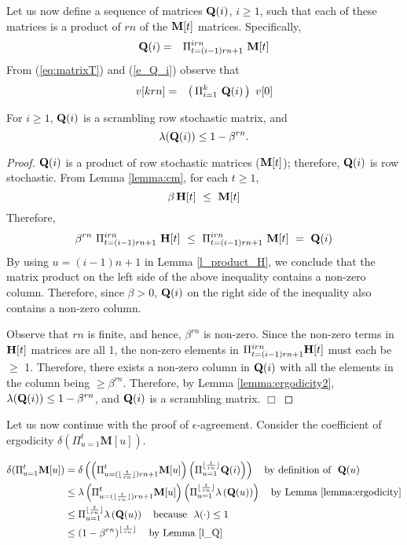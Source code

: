 \documentclass{llncs}
\newcommand{\fillbox}{\hspace*{\fill}\(\Box\)}
\newcommand{\bfH}{{\bf H}}
\newcommand{\bfQ}{{\bf Q}}
\newcommand{\bfM}{{\bf M}}
\newcommand{\bfv}{v}
\newcommand{\matrixm}{\textbf{M}}
\begin{document}
Let us now define a sequence of matrices $\bfQ(i)$, $i\geq 1$, such that
each of these matrices is a product of $r n$ of the
$\bfM[t]$ matrices. Specifically,
\begin{eqnarray}
\bfQ(i) &=& \Pi_{t=(i-1)r n+1}^{i r n} ~ \bfM[t]
\label{e_Q_i}
\end{eqnarray}
From (\ref{eq:matrixT}) and (\ref{e_Q_i})
observe that
\begin{eqnarray}
\bfv[k r n] & = & \left(\, \Pi_{i=1}^k ~ \bfQ(i) \,\right)~\bfv[0]
\end{eqnarray}


\begin{lemma}
\label{l_Q}
For $i\geq 1$, $\bfQ(i)$ is a scrambling row stochastic matrix,
and \[ \lambda(\bfQ(i))\leq 1-\beta^{r n}.\]
\end{lemma}

\begin{proof}

$\bfQ(i)$ is a product of row stochastic matrices ($\bfM[t]$); therefore,
$\bfQ(i)$ is row stochastic.
From Lemma \ref{lemma:cm}, for each $t\geq 1$,
\[
\beta \, \bfH[t] ~ \leq ~ \bfM[t]
\]
Therefore, 
\[
\beta^{r n} ~ \Pi_{t=(i-1)r n+1}^{i r n} ~ \bfH[t] ~ \leq 
~ \Pi_{t=(i-1) r n+1}^{i r n} ~ \bfM[t] ~ =
~ \bfQ(i)
\]
By using $u=(i-1)n+1$ in Lemma \ref{l_product_H},
we conclude that the matrix product on the left side
of the above inequality contains a non-zero column. Therefore, since $\beta > 0$, $\bfQ(i)$ on the
right side of the inequality also contains
a non-zero column.

Observe that $r n$ is finite, and hence, $\beta^{r n}$
is non-zero. Since the non-zero terms in $\bfH[t]$ matrices are all 1,
the non-zero elements in $\Pi_{t=(i-1) r n+1}^{i r n} \bfH[t]$
must each be $\geq$ 1. Therefore, there exists a non-zero column in $\bfQ(i)$
with all the elements in the column being $\geq \beta^{r n}$.
Therefore, by Lemma \ref{lemma:ergodicity2}, $\lambda(\bfQ(i))\leq 1-\beta^{r n}$, and $\bfQ(i)$ is a scrambling matrix. 
\fillbox
\end{proof}

Let us now continue with the proof of $\epsilon$-agreement. Consider the coefficient of ergodicity $\delta(\Pi_{u=1}^t \matrixm[u])$.




\begin{align}
\delta(\Pi_{u=1}^t \bfM[u]) &= \delta\left(
\left(\Pi_{u=(\lfloor\frac{t}{r n}\rfloor)r n+1}^t \bfM[u]\right)
\left(\Pi_{u=1}^{\lfloor\frac{t}{r n}\rfloor} \bfQ(i)\right)\right)~~~\text{by definition of}~~\bfQ(u)\nonumber\\
&\leq \lambda
\left(\Pi_{u=(\lfloor\frac{t}{r n}\rfloor)r n+1}^t \bfM[u]\right)
\left(\Pi_{u=1}^{\lfloor\frac{t}{r n}\rfloor} \lambda\left( \bfQ(u)\right)\right)~~~\text{by Lemma \ref{lemma:ergodicity}}\nonumber\\
&\leq \Pi_{u=1}^{\lfloor\frac{t}{r n}\rfloor} \lambda\left(\bfQ(u)\right)~~~\text{because}~~\lambda(\cdot) \leq 1\nonumber\\
&\leq \left( 1-\beta^{rn}\right)^{\lfloor\frac{t}{r n}\rfloor}~~~\text{by Lemma \ref{l_Q}}\label{eq:t}
\end{align}
\end{document}
